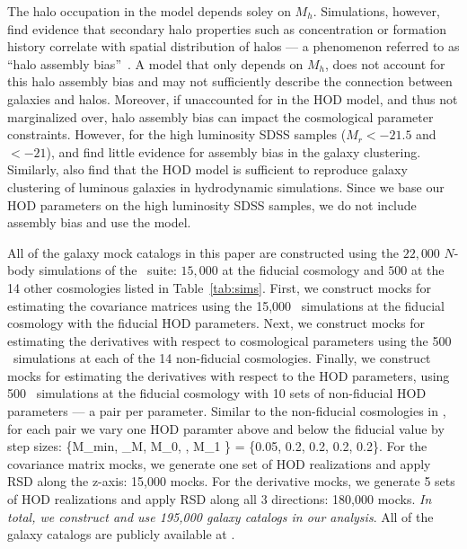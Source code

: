 The halo occupation in the \cite{zheng2007} model depends soley on $M_h$. 
Simulations, however, find evidence that secondary halo properties such as
concentration or formation history correlate with spatial distribution of
halos --- a phenomenon referred to as ``halo assembly bias''~\citep[\eg][]{sheth2004,
gao2005, harker2006, wechsler2006, dalal2008, wang2009a, lacerna2014,
contreras2020, hadzhiyska2020}.
A model that only depends on $M_h$, does not account for this halo assembly 
bias and may not sufficiently describe the connection between galaxies and 
halos. Moreover, if unaccounted for in the HOD model, and thus not marginalized 
over, halo assembly bias can impact the cosmological parameter constraints. 
However, for the high luminosity SDSS samples ($M_r < -21.5$  and $<-21$), 
\cite{zentner2016} and \cite{vakili2019} find little evidence for assembly bias 
in the galaxy clustering. Similarly, \cite{beltz-mohrmann2020} also find that
the \cite{zheng2007} HOD model is sufficient to reproduce galaxy clustering of
luminous galaxies in hydrodynamic simulations. Since we base our HOD parameters
on the high luminosity SDSS samples, we do not include assembly bias and use
the \cite{zheng2007} model. 


All of the galaxy mock catalogs in this paper are constructed using the $22,000$ 
$N$-body simulations of the \quij~suite: $15,000$ at the fiducial cosmology and $500$ at the 14 other cosmologies
listed in Table~\ref{tab:sims}. First, we construct mocks for estimating the
covariance matrices using the 15,000 \quij~simulations at the fiducial cosmology with
the fiducial HOD parameters. Next, we construct mocks for estimating the
derivatives with respect to cosmological parameters using the 500
\quij~simulations at each of the 14 non-fiducial cosmologies. Finally, we construct mocks for
estimating the derivatives with respect to the HOD parameters, using 500 
\quij~simulations at the fiducial cosmology with 10 sets of non-fiducial HOD
parameters --- a pair per parameter. Similar to the non-fiducial cosmologies in
\quij, for each pair we vary one HOD paramter above and below the fiducial
value by step sizes:
\beq
\{\Delta M_{\rm min}, \Delta \sigma_{\log M}, \Delta \log M_0, \Delta \alpha,
\Delta \log M_1 \} = \{0.05, 0.2, 0.2, 0.2, 0.2\}.
\eeq
For the covariance matrix mocks, we generate one set of HOD realizations and apply 
RSD along the z-axis: 15,000 mocks. For the derivative mocks, we generate 5
sets of HOD realizations and apply RSD along all 3 directions: 180,000 mocks.
{\em In total, we construct and use 195,000 galaxy catalogs in our analysis}.
All of the galaxy catalogs are publicly available at .
